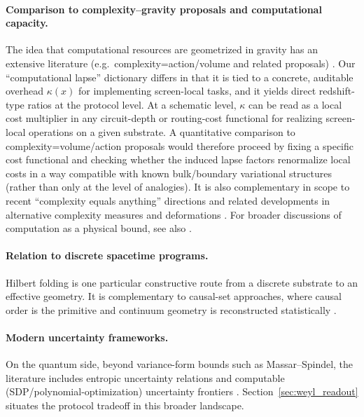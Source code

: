 \paragraph{Comparison to complexity--gravity proposals and computational capacity.}
The idea that computational resources are geometrized in gravity has an extensive literature (e.g.\ complexity=action/volume and related proposals) \cite{Susskind2014ComplexityHorizons,BrownRobertsSusskindSwingleZhao2016}.
Our ``computational lapse'' dictionary differs in that it is tied to a concrete, auditable overhead $\kappa(x)$ for implementing screen-local tasks, and it yields direct redshift-type ratios at the protocol level.
At a schematic level, $\kappa$ can be read as a local cost multiplier in any circuit-depth or routing-cost functional for realizing screen-local operations on a given substrate.
A quantitative comparison to complexity=volume/action proposals would therefore proceed by fixing a specific cost functional and checking whether the induced lapse factors renormalize local costs in a way compatible with known bulk/boundary variational structures (rather than only at the level of analogies).
It is also complementary in scope to recent ``complexity equals anything'' directions and related developments in alternative complexity measures and deformations \cite{BelinMyersRuanSarosiSperanza2022PRL,BelinMyersRuanSarosiSperanza2023JHEP,MyersRuan2024CEAlmostAnything,JorstadMyersRuan2023SingularityProbes,HellerPapaliniSchuhmann2024KrylovSpreadComplexity,FarajiAstaneh2024TTbarComplexity}.
For broader discussions of computation as a physical bound, see also \cite{Lloyd2000}.

\paragraph{Relation to discrete spacetime programs.}
Hilbert folding is one particular constructive route from a discrete substrate to an effective geometry.
It is complementary to causal-set approaches, where causal order is the primitive and continuum geometry is reconstructed statistically \cite{BombelliLeeMeyerSorkin1987}.

\paragraph{Modern uncertainty frameworks.}
On the quantum side, beyond variance-form bounds such as Massar--Spindel, the literature includes entropic uncertainty relations and computable (SDP/polynomial-optimization) uncertainty frontiers \cite{MaassenUffink1988,BertaChristandlColbeckRenesRenner2011,SchwonnekReebWerner2016,BermejoMoranHuber2024}.
Section~\ref{sec:weyl_readout} situates the protocol tradeoff in this broader landscape.

